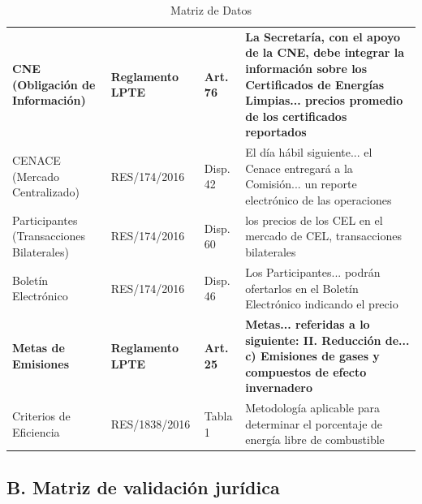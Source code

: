 \documentclass{cel}
\begin{document}
\vspace{0.3cm}
\begin{tabladoradoLargo}
\renewcommand{\tabularxcolumn}[1]{p{#1}}
\begin{xltabular}{\textwidth}{|X|X|X|X|}
\caption{Matriz de Datos} \\
\toprule
{}  &  &  &  \\
\midrule
\endhead
\textbf{CNE (Obligación de Información)} & \textbf{Reglamento LPTE} & \textbf{Art. 76} & \textbf{\textquotedbl{}La Secretaría, con el apoyo de la CNE, debe integrar la información sobre los Certificados de Energías Limpias... precios promedio de los certificados reportados\textquotedbl{}} \\ \hline
CENACE (Mercado Centralizado) & RES/174/2016 & Disp. 42 & \textquotedbl{}El día hábil siguiente... el Cenace entregará a la Comisión... un reporte electrónico de las operaciones\textquotedbl{} \\ \hline
Participantes (Transacciones Bilaterales) & RES/174/2016 & Disp. 60 & \textquotedbl{}los precios de los CEL en el mercado de CEL, transacciones bilaterales\textquotedbl{} \\ \hline
Boletín Electrónico & RES/174/2016 & Disp. 46 & \textquotedbl{}Los Participantes... podrán ofertarlos en el Boletín Electrónico indicando el precio\textquotedbl{} \\ \hline
\textbf{Metas de Emisiones} & \textbf{Reglamento LPTE} & \textbf{Art. 25} & \textbf{\textquotedbl{}Metas... referidas a lo siguiente: II. Reducción de... c) Emisiones de gases y compuestos de efecto invernadero\textquotedbl{}} \\ \hline
Criterios de Eficiencia & RES/1838/2016 & Tabla 1 & \textquotedbl{}Metodología aplicable para determinar el porcentaje de energía libre de combustible\textquotedbl{} \\ \hline
\bottomrule
\end{xltabular}
\end{tabladoradoLargo}

\vspace{0.4cm}
\subsection{B. Matriz de validación jurídica}
\nopagebreak
\end{document}
